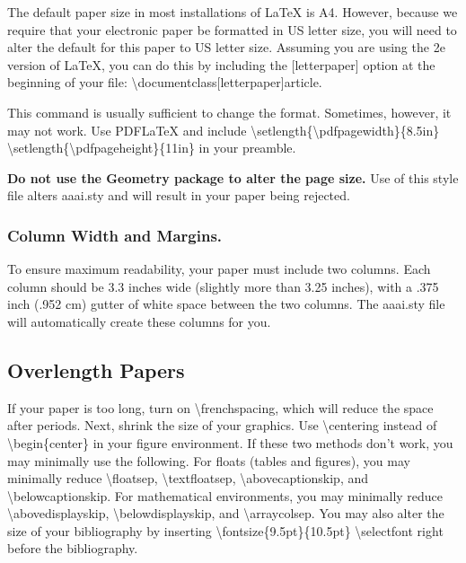 \documentclass[letterpaper]{article}
\begin{document}
The default paper size in most installations of \LaTeX{} is A4. However, because we require that your electronic paper be formatted in US letter size, you will need to alter the default for this paper to US letter size. Assuming you are using the 2e version of \LaTeX{}, you can do this by including the [letterpaper] option at the beginning of your file: 
\textbackslash documentclass[letterpaper]{article}. 

This command is usually sufficient to change the format. Sometimes, however, it may not work. Use PDF\LaTeX{} and include
\textbackslash setlength\{\textbackslash pdfpagewidth\}\{8.5in\}
\textbackslash setlength\{\textbackslash pdfpageheight\}\{11in\}
in your preamble. 

\textbf{Do not use the Geometry package to alter the page size.} Use of this style file alters aaai.sty and will result in your paper being rejected. 


\subsubsection{Column Width and Margins.}
To ensure maximum readability, your paper must include two columns. Each column should be 3.3 inches wide (slightly more than 3.25 inches), with a .375 inch (.952 cm) gutter of white space between the two columns. The aaai.sty file will automatically create these columns for you. 

\subsection{Overlength Papers}
If your paper is too long, turn on \textbackslash frenchspacing, which will reduce the space after periods. Next,  shrink the size of your graphics. Use \textbackslash centering instead of \textbackslash begin\{center\} in your figure environment. If these two methods don't work, you may minimally use the following. For floats (tables and figures), you may minimally reduce \textbackslash floatsep, \textbackslash textfloatsep, \textbackslash abovecaptionskip, and \textbackslash belowcaptionskip. For mathematical environments, you may minimally reduce \textbackslash abovedisplayskip, \textbackslash belowdisplayskip, and \textbackslash arraycolsep. You may also alter the size of your bibliography by inserting \textbackslash fontsize\{9.5pt\}\{10.5pt\} \textbackslash selectfont
right before the bibliography. 
\end{document}
